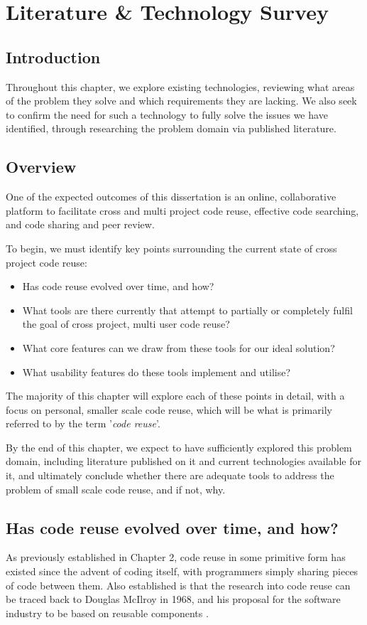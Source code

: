 \chapter{Literature \& Technology Survey}
\section{Introduction}
Throughout this chapter, we explore existing technologies, reviewing what areas of the problem they solve and which requirements they are lacking.
We also seek to confirm the need for such a technology to fully solve the issues we have identified, through researching the problem domain via published literature.

\section{Overview}
One of the expected outcomes of this dissertation is an online, collaborative platform to facilitate cross and multi project code reuse, effective code searching, and code sharing and peer review.

To begin, we must identify key points surrounding the current state of cross project code reuse:


\begin{itemize}
\item Has code reuse evolved over time, and how?
\item What tools are there currently that attempt to partially or completely fulfil the goal of cross project, multi user code reuse?
\item What core features can we draw from these tools for our ideal solution?
\item What usability features do these tools implement and utilise?
\end{itemize}


The majority of this chapter will explore each of these points in detail, with a focus on personal, smaller scale code reuse, which will be what is primarily referred to by the term '\textit{code reuse}'. 

By the end of this chapter, we expect to have sufficiently explored this problem domain, including literature published on it and current technologies available for it, and ultimately conclude whether there are adequate tools to address the problem of small scale code reuse, and if not, why.

\section{Has code reuse evolved over time, and how?}
As previously established in Chapter 2, code reuse in some primitive form has existed since the advent of coding itself, with programmers simply sharing pieces of code between them. 
Also established is that the research into code reuse can be traced back to Douglas McIlroy in 1968, and his proposal for the software industry to be based on reusable components \cite{Naur1969,Jacobson1997}. 

